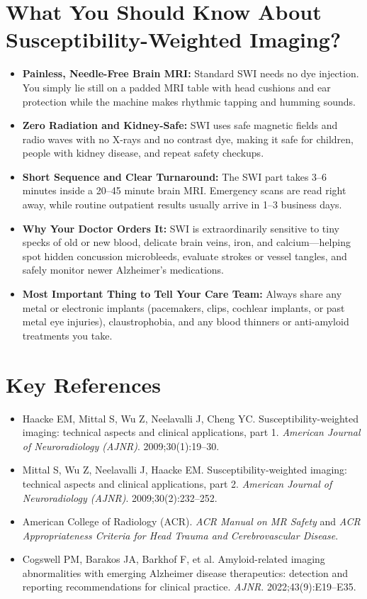\section{What You Should Know About Susceptibility-Weighted Imaging?}

\begin{itemize}
    \item \textbf{Painless, Needle-Free Brain MRI:} Standard SWI needs no dye injection. You simply lie still on a padded MRI table with head cushions and ear protection while the machine makes rhythmic tapping and humming sounds.
    \item \textbf{Zero Radiation and Kidney-Safe:} SWI uses safe magnetic fields and radio waves with no X-rays and no contrast dye, making it safe for children, people with kidney disease, and repeat safety checkups.
    \item \textbf{Short Sequence and Clear Turnaround:} The SWI part takes 3--6 minutes inside a 20--45 minute brain MRI. Emergency scans are read right away, while routine outpatient results usually arrive in 1--3 business days.
    \item \textbf{Why Your Doctor Orders It:} SWI is extraordinarily sensitive to tiny specks of old or new blood, delicate brain veins, iron, and calcium---helping spot hidden concussion microbleeds, evaluate strokes or vessel tangles, and safely monitor newer Alzheimer's medications.
    \item \textbf{Most Important Thing to Tell Your Care Team:} Always share any metal or electronic implants (pacemakers, clips, cochlear implants, or past metal eye injuries), claustrophobia, and any blood thinners or anti-amyloid treatments you take.
\end{itemize}

\section{Key References}

\begin{itemize}
    \item Haacke EM, Mittal S, Wu Z, Neelavalli J, Cheng YC. Susceptibility-weighted imaging: technical aspects and clinical applications, part 1. \textit{American Journal of Neuroradiology (AJNR)}. 2009;30(1):19--30.
    \item Mittal S, Wu Z, Neelavalli J, Haacke EM. Susceptibility-weighted imaging: technical aspects and clinical applications, part 2. \textit{American Journal of Neuroradiology (AJNR)}. 2009;30(2):232--252.
    \item American College of Radiology (ACR). \textit{ACR Manual on MR Safety} and \textit{ACR Appropriateness Criteria for Head Trauma and Cerebrovascular Disease}.
    \item Cogswell PM, Barakos JA, Barkhof F, et al. Amyloid-related imaging abnormalities with emerging Alzheimer disease therapeutics: detection and reporting recommendations for clinical practice. \textit{AJNR}. 2022;43(9):E19--E35.
\end{itemize}
